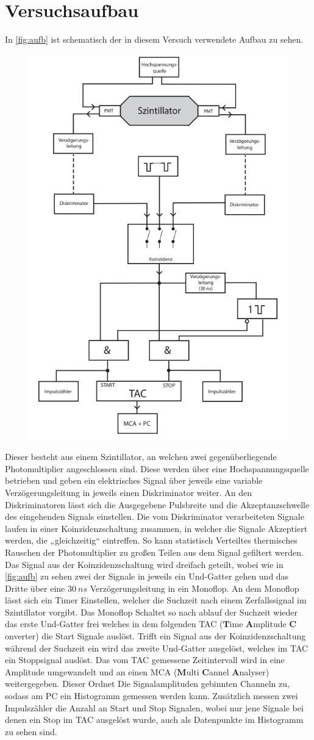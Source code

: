 \section{Versuchsaufbau}
In \autoref{fig:aufb} ist schematisch der in diesem Versuch verwendete Aufbau zu sehen.
\begin{figure}[H]
    \centering
    \includegraphics[width=0.5\linewidth]{data/aufbau_schem.png}
    \label{fig:aufb}
\end{figure}
\noindent
Dieser besteht aus einem Szintillator, an welchen zwei gegenüberliegende Photomultiplier angeschlossen sind. Diese werden über eine Hochspannungsquelle betrieben und geben ein 
elektrisches Signal über jeweils eine variable Verzögerungsleitung in jeweils einen Diskriminator weiter. An den Diskriminatoren lässt sich die Ausgegebene Pulsbreite und die Akzeptanzschwelle des eingehenden Signals einstellen.
Die vom Diskriminator verarbeiteten Signale laufen in einer Koinzidenzschaltung zusammen, in welcher die Signale Akzeptiert werden, die „gleichzeitig“ eintreffen. So kann statistisch Verteiltes thermisches Rauschen der Photomultiplier zu großen Teilen aus dem Signal gefiltert werden. Das Signal aus der Koinzidenzschaltung wird dreifach geteilt, wobei wie in \autoref{fig:aufb} zu sehen zwei der Signale in jeweils 
ein Und-Gatter gehen und das Dritte über eine $\SI{30}{ns}$ Verzögerungsleitung in ein Monoflop. An dem Monoflop lässt sich ein Timer Einstellen, welcher die Suchzeit nach einem Zerfallssignal im Szintillator vorgibt. Das Monoflop Schaltet so nach ablauf der Suchzeit wieder das erste Und-Gatter frei welches in dem folgenden TAC ($\textbf{T}$ime $\textbf{A}$mplitude $\textbf{C}$onverter)
die Start Signale auslöst. Trifft ein Signal aus der Koinzidenzschaltung während der Suchzeit ein wird das zweite Und-Gatter ausgelöst, welches im TAC ein Stoppsignal auslöst. Das vom TAC gemessene Zeitintervall wird in eine Amplitude umgewandelt und an einen MCA ($\textbf{M}$ulti $\textbf{C}$annel $\textbf{A}$nalyser) weitergegeben. Dieser Ordnet Die Signalamplituden gebinnten Channeln zu, sodass am PC ein Histogramm gemessen werden kann.
Zusätzlich messen zwei Impulszähler die Anzahl an Start und Stop Signalen, wobei nur jene Signale bei denen ein Stop im TAC ausgelöst wurde, auch als Datenpunkte im Histogramm zu sehen sind.
\newpage
